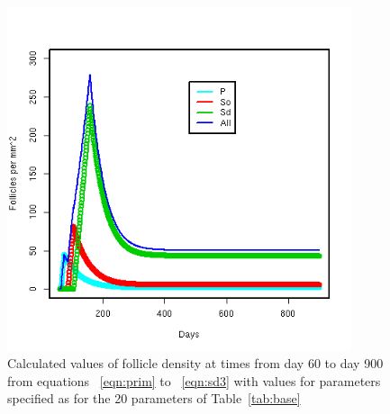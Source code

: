 %

\begin{figure}[!h]
  \centering
   \includegraphics[width=0.9\textwidth]{basedens.png}
  \caption{Calculated values of follicle density at times from day 60 to day 900 from equations ~\ref{eqn:prim} to ~\ref{eqn:sd3} with values for parameters specified as for the 20 parameters of Table~\ref{tab:base}}
  \label{fig:basedens}
\end{figure}

%

